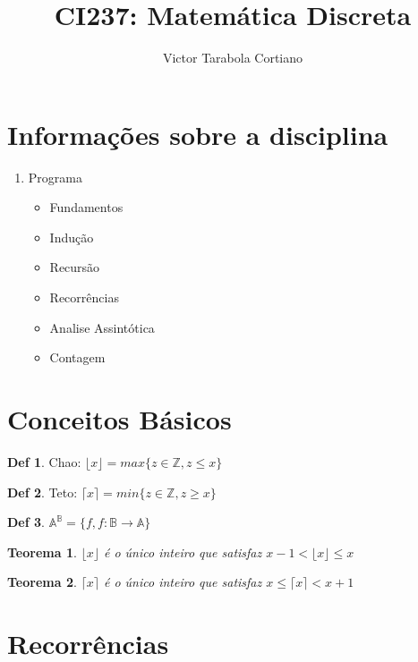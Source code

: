 \documentclass[a4paper,11pt]{article}
\author{Victor Tarabola Cortiano}
\title{CI237: Matem\'{a}tica Discreta}
\theoremstyle{definition} \newtheorem{definicao}{Def}
\theoremstyle{definition} \newtheorem{exemplo}{Exemplo}
\theoremstyle{plain}      \newtheorem{teorema}{Teorema}
\theoremstyle{remark}     \newtheorem*{corolario}{Corol\'{a}rio}
\begin{document}
\maketitle
\tableofcontents

\newpage



\section{Informa\c{c}\~{o}es sobre a disciplina}

\begin{enumerate}

\item Programa
\begin{itemize}
\item Fundamentos
\item Indu\c{c}\~{a}o
\item Recurs\~{a}o
\item Recorr\^{e}ncias
\item Analise Assint\'{o}tica
\item Contagem
\end{itemize}
\end{enumerate}

\section{Conceitos B\'{a}sicos}

\begin{definicao}
Chao: $\lfloor x \rfloor = max\{z \in \mathbb{Z}, z \leq x\}$
\end{definicao}
\begin{definicao}
Teto: $\lceil  x \rceil  = min\{z \in \mathbb{Z}, z \geq x\}$
\end{definicao}
\begin{definicao}
$\mathbb{A}^\mathbb{B} = \{f, f: \mathbb{B} \longrightarrow \mathbb{A}\}$
\end{definicao}

\begin{teorema}
$\lfloor x \rfloor$ \'{e} o \'{u}nico inteiro que satisfaz
$x - 1 < \lfloor x \rfloor \leq x$
\end{teorema}
\begin{teorema}
$\lceil x \rceil$ \'{e} o \'{u}nico inteiro que satisfaz
$x \leq \lceil x \rceil < x + 1$
\end{teorema}

\section{Recorr\^{e}ncias}
\end{document}
